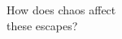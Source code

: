 \documentclass[preview]{standalone}
\begin{document}
How does chaos affect\\ these escapes?\\
\end{document}
